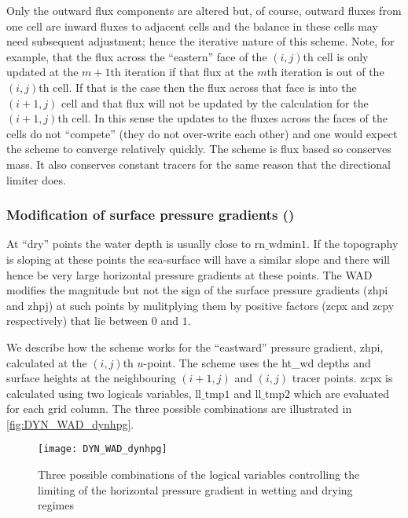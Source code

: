 \documentclass[../main/NEMO_manual]{subfiles}
\begin{document}
Only the outward flux components are altered but, of course, outward fluxes from one cell
are inward fluxes to adjacent cells and the balance in these cells may need subsequent
adjustment; hence the iterative nature of this scheme.  Note, for example, that the flux
across the ``eastern'' face of the $(i,j)$th cell is only updated at the $m+1$th iteration
if that flux at the $m$th iteration is out of the $(i,j)$th cell. If that is the case then
the flux across that face is into the $(i+1,j)$ cell and that flux will not be updated by
the calculation for the $(i+1,j)$th cell. In this sense the updates to the fluxes across
the faces of the cells do not ``compete'' (they do not over-write each other) and one
would expect the scheme to converge relatively quickly. The scheme is flux based so
conserves mass. It also conserves constant tracers for the same reason that the
directional limiter does.

\subsubsection[Modification of surface pressure gradients (\textit{dynhpg.F90})]{Modification of surface pressure gradients ()}
\label{subsec:DYN_wd_il_spg}

At ``dry'' points the water depth is usually close to $\mathrm{rn\_wdmin1}$. If the
topography is sloping at these points the sea-surface will have a similar slope and there
will hence be very large horizontal pressure gradients at these points. The WAD modifies
the magnitude but not the sign of the surface pressure gradients (zhpi and zhpj) at such
points by mulitplying them by positive factors (zcpx and zcpy respectively) that lie
between $0$ and $1$.

We describe how the scheme works for the ``eastward'' pressure gradient, zhpi, calculated
at the $(i,j)$th $u$-point. The scheme uses the ht\_wd depths and surface heights at the
neighbouring $(i+1,j)$ and $(i,j)$ tracer points.  zcpx is calculated using two logicals
variables, $\mathrm{ll\_tmp1}$ and $\mathrm{ll\_tmp2}$ which are evaluated for each grid
column.  The three possible combinations are illustrated in \autoref{fig:DYN_WAD_dynhpg}.

\begin{figure}[!ht]
  \centering
  \texttt{[image: DYN\_WAD\_dynhpg]}
  \caption[Combinations controlling the limiting of the horizontal pressure gradient in
  wetting and drying regimes]{
    Three possible combinations of the logical variables controlling the
    limiting of the horizontal pressure gradient in wetting and drying regimes}
  \label{fig:DYN_WAD_dynhpg}
\end{figure}
\end{document}
